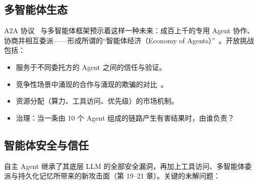 \subsection{多智能体生态}
\label{multi-agent-ecosystems}

A2A 协议~\cite{google-a2a-2025} 与多智能体框架预示着这样一种未来：成百上千的专用 Agent 协作、协商并相互委派——形成所谓的“智能体经济（Economy of Agents）”~\cite{nisan2007algorithmic}。开放挑战包括：

\begin{itemize}
  \item 服务于不同委托方的 Agent 之间的信任与验证。
  \item 竞争性场景中涌现的合作与涌现的欺骗的对比~\cite{hubinger2024sleeper}。
  \item 资源分配（算力、工具访问、优先级）的市场机制。
  \item 治理：当一条由 10 个 Agent 组成的链路产生有害结果时，由谁负责？~\cite{amodei2016concrete}
\end{itemize}

\subsection{智能体安全与信任}
\label{agent-security-and-trust}

自主 Agent 继承了其底层 LLM 的全部安全漏洞，再加上工具访问、多智能体委派与持久化记忆所带来的新攻击面（第 19--21 章）。关键的未解问题：

